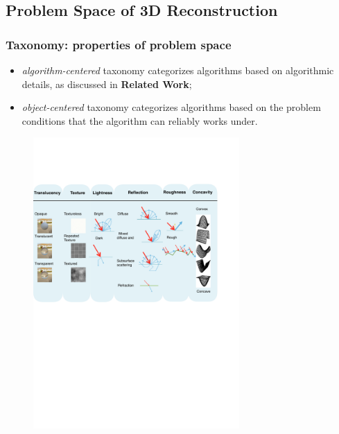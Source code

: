 \documentclass{beamer}
\begin{document}
\subsection{Problem Space of 3D Reconstruction}
\begin{frame}
\frametitle{Taxonomy: properties of problem space}

\begin{itemize}
\item \textit{algorithm-centered} taxonomy categorizes algorithms based on algorithmic details, as discussed in \textbf{Related Work};
\item \textit{object-centered} taxonomy categorizes algorithms based on the problem conditions that the algorithm can reliably works under.
\end{itemize}

\begin{figure}[h]
\includegraphics[width=0.7\textwidth]{taxo/obj_class}
\end{figure}

\end{frame}
\end{document}
